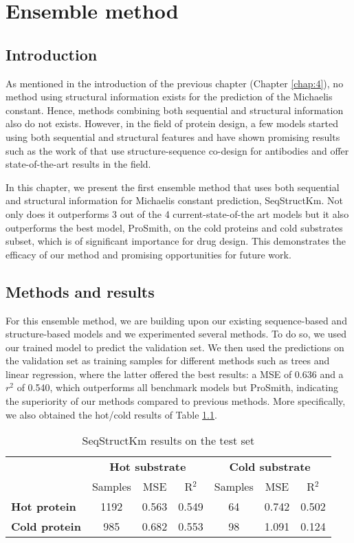 
\chapter{Ensemble method}

\section{Introduction}

As mentioned in the introduction of the previous chapter (Chapter \ref{chap:4}), no method using structural information exists for the prediction of the Michaelis constant. Hence, methods combining both sequential and structural information also do not exists. However, in the field of protein design, a few models started using both sequential and structural features and have shown promising results such as the work of \citeauthor{wu2023a} that use structure-sequence co-design for antibodies and offer state-of-the-art results in the field.

In this chapter, we present the first ensemble method that uses both sequential and structural information for Michaelis constant prediction, SeqStructKm. Not only does it outperforms 3 out of the 4 current-state-of-the art models but it also outperforms the best model, ProSmith, on the cold proteins and cold substrates subset, which is of significant importance for drug design. This demonstrates the efficacy of our method and promising opportunities for future work.

\section{Methods and results}

For this ensemble method, we are building upon our existing sequence-based and structure-based models and we
experimented several methods. To do so, we used our trained model to predict the validation set. We then used
the predictions on the validation set as training samples for different methods such as trees and linear
regression, where the latter offered the best results: a MSE of 0.636 and a $r^2$ of 0.540, which outperforms all benchmark models but ProSmith, indicating the superiority of our methods compared to previous methods. More specifically, we also obtained the hot/cold results of Table \ref{tab:seqstruct_test}.

\begin{table}[ht]
  \centering
  \begin{tabular}{lcccccc}
  \hline
   & \multicolumn{3}{c}{\textbf{Hot substrate}} & \multicolumn{3}{c}{\textbf{Cold substrate}} \\
   & Samples & MSE & R\(^2\) & Samples & MSE & R\(^2\) \\ \hline
  \textbf{Hot protein}  & 1192 & 0.563 & 0.549 & 64 & 0.742 & 0.502 \\
  \textbf{Cold protein} & 985 & 0.682 & 0.553 & 98 & 1.091 & 0.124 \\ \hline
  \end{tabular}
  \caption{SeqStructKm results on the test set}
  \label{tab:seqstruct_test}
\end{table}

